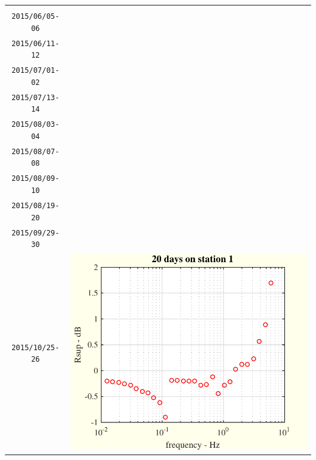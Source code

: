 \documentclass[a4paper, 12pt]{report}
\begin{document}
\begin{tabular}{cc}
 \begin{minipage}{0.35\textwidth}
 days:\\
 {\tt   2015/06/05-06}\\
 {\tt   2015/06/11-12}  \\
 {\tt   2015/07/01-02}  \\
 {\tt   2015/07/13-14}  \\
 {\tt   2015/08/03-04}  \\
 {\tt   2015/08/07-08}  \\
 {\tt   2015/08/09-10}  \\
 {\tt   2015/08/19-20}  \\
 {\tt   2015/09/29-30}  \\
 {\tt   2015/10/25-26}  
\end{minipage}
&
 \begin{minipage}{0.35\textwidth}
\includegraphics[scale=0.8]{example1onstation1.pdf}
\end{minipage}
\end{tabular}
 
 
\end{document}
